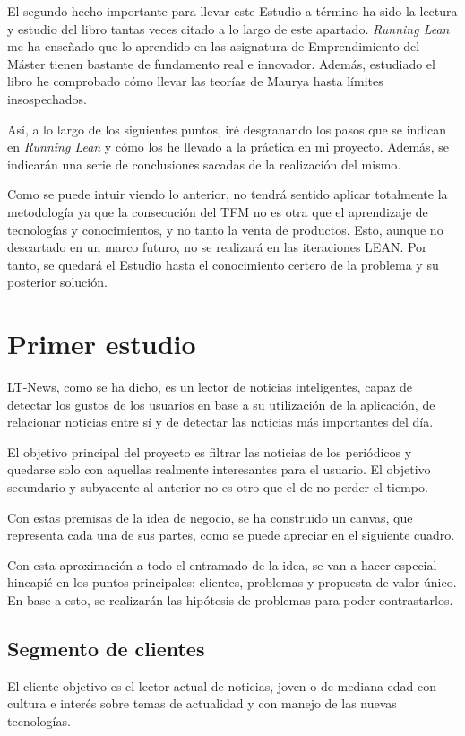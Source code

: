 El segundo hecho importante para llevar este Estudio a término ha sido la lectura y estudio del libro tantas veces citado a lo largo de este apartado. \textit{Running Lean} me ha enseñado que lo aprendido en las asignatura de Emprendimiento del Máster tienen bastante de fundamento real e innovador. Además, estudiado el libro he comprobado cómo llevar las teorías de Maurya hasta límites insospechados.

Así, a lo largo de los siguientes puntos, iré desgranando los pasos que se indican en \textit{Running Lean} y cómo los he llevado a la práctica en mi proyecto. Además, se indicarán una serie de conclusiones sacadas de la realización del mismo.

Como se puede intuir viendo lo anterior, no tendrá sentido aplicar totalmente la metodología ya que la consecución del TFM no es otra que el aprendizaje de tecnologías y conocimientos, y no tanto la venta de productos. Esto, aunque no descartado en un marco futuro, no se realizará en las iteraciones LEAN. Por tanto, se quedará el Estudio hasta el conocimiento certero de la problema y su posterior solución.


\section{Primer estudio}\label{sec:primer_estudio}

LT-News, como se ha dicho, es un lector de noticias inteligentes, capaz de detectar los gustos de los usuarios en base a su utilización de la aplicación, de relacionar noticias entre sí y de detectar las noticias más importantes del día.

El objetivo principal del proyecto es filtrar las noticias de los periódicos y quedarse solo con aquellas realmente interesantes para el usuario. El objetivo secundario y subyacente al anterior no es otro que el de no perder el tiempo.

Con estas premisas de la idea de negocio, se ha construido un canvas, que representa cada una de sus partes, como se puede apreciar en el siguiente cuadro.


Con esta aproximación a todo el entramado de la idea, se van a hacer especial hincapié en los puntos principales: clientes, problemas y propuesta de valor único. En base a esto, se realizarán las hipótesis de problemas para poder contrastarlos.

\subsection{Segmento de clientes}
El cliente objetivo es el lector actual de noticias, joven o de mediana edad con cultura e interés sobre temas de actualidad y con manejo de las nuevas tecnologías. 

